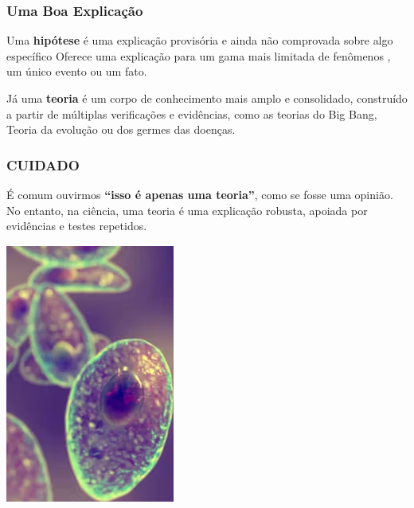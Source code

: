 \documentclass[
  letterpaper,
  DIV=11,
  numbers=noendperiod]{scrreprt}
\begin{document}
\subsubsection{Uma Boa Explicação}\label{uma-boa-explicauxe7uxe3o}

Uma \textbf{hipótese} é uma explicação provisória e ainda não comprovada
sobre algo específico Oferece uma explicação para um gama mais limitada
de fenômenos , um único evento ou um fato.

Já uma \textbf{teoria} é um corpo de conhecimento mais amplo e
consolidado, construído a partir de múltiplas verificações e evidências,
como as teorias do Big Bang, Teoria da evolução ou dos germes das
doenças.

\subsubsection{CUIDADO}\label{cuidado}

\begin{tcolorbox}[enhanced jigsaw, leftrule=.75mm, coltitle=black, colframe=quarto-callout-warning-color-frame, toprule=.15mm, opacitybacktitle=0.6, bottomtitle=1mm, bottomrule=.15mm, titlerule=0mm, toptitle=1mm, title=\textcolor{quarto-callout-warning-color}{\faExclamationTriangle}\hspace{0.5em}{Importante}, arc=.35mm, breakable, opacityback=0, colbacktitle=quarto-callout-warning-color!10!white, colback=white, left=2mm, rightrule=.15mm]

É comum ouvirmos \textbf{``isso é apenas uma teoria''}, como se fosse
uma opinião. No entanto, na ciência, uma teoria é uma explicação
robusta, apoiada por evidências e testes repetidos.

\end{tcolorbox}

\includegraphics[width=0.4\linewidth,height=\textheight,keepaspectratio]{figuras0/teoria.png}
\end{document}
